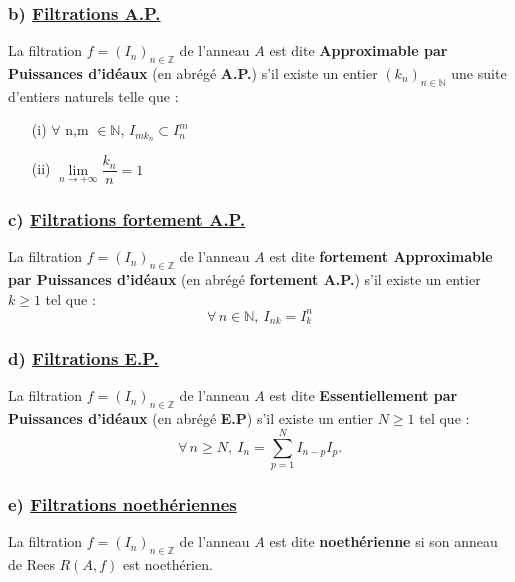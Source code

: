\subsubsection{b) \underline{Filtrations A.P.}}
\begin{madefinition}
	La filtration $f = (I_n)_{n \in \mathbb{Z}}$ de l'anneau $A$ est dite \textbf{Approximable par Puissances d'idéaux} (en abrégé \textbf{A.P.}) s'il existe un entier $(k_{n})_{n \in \mathbb{N}}$ une suite d'entiers naturels telle que :
	\begin{enumerate}
		\item[(i)] $\forall$ n,m $\in \mathbb{N}$, $I_{mk_n} \subset I_n^{m}$
		\item[(ii)] $\underset{n\longrightarrow +\infty }{\lim }\dfrac{k_{n}}{n}=1$
	\end{enumerate}
\end{madefinition}
\subsubsection{c) \underline{Filtrations fortement A.P.}}
\begin{madefinition}
	La filtration $f = (I_n)_{n \in \mathbb{Z}}$ de l'anneau $A$ est dite \textbf{fortement Approximable par Puissances d'idéaux} (en abrégé \textbf{fortement A.P.}) s'il existe un entier $k \geqslant 1$ tel que :
	\[ \forall \, n \in \mathbb{N}, \ I_{nk} = I_k^n \]
\end{madefinition}
\subsubsection{d) \underline{Filtrations E.P.}}
\begin{madefinition}
	La filtration $f = (I_n)_{n \in \mathbb{Z}}$ de l'anneau $A$ est dite \textbf{Essentiellement par Puissances d'idéaux} (en abrégé \textbf{E.P}) s'il existe un entier $N \geqslant 1$ tel que :
	\[ \forall \, n \geqslant N, \ I_n =\sum_{p=1}^{N} I_{n-p}I_p. \]
\end{madefinition}
\subsubsection{e) \underline{Filtrations noethériennes}}
\begin{madefinition}
	La filtration $f = (I_n)_{n \in \mathbb{Z}}$ de l'anneau $A$ est dite \textbf{noethérienne} si son anneau de Rees ${R}(A,f)$ est noethérien.
\end{madefinition}
